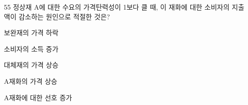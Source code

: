 \begin{question}{55}
정상재 A에 대한 수요의 가격탄력성이 1보다 클 때, 이 재화에 대한 소비자의 지출액이 감소하는 원인으로 적절한 것은?
\begin{choices}
  \item 보완재의 가격 하락
  \item 소비자의 소득 증가
  \item 대체재의 가격 상승
  \item A재화의 가격 상승
  \item A재화에 대한 선호 증가
\end{choices}
\end{question}
